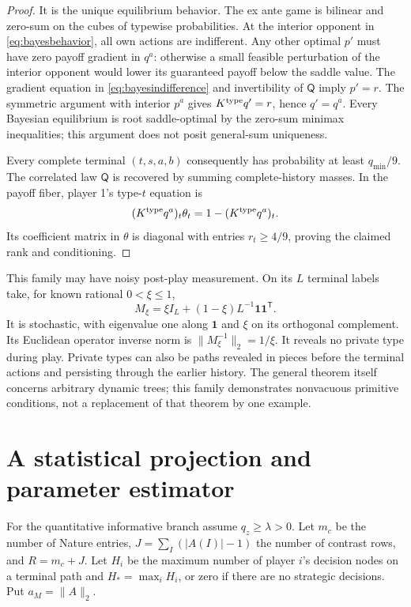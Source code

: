 \documentclass[11pt,a4paper]{article}
\numberwithin{equation}{section}
\theoremstyle{definition}
\begin{document}
\begin{proof}
It is the unique equilibrium behavior. The ex ante game is bilinear
and zero-sum on the cubes of typewise probabilities. At the interior
opponent in \eqref{eq:bayesbehavior}, all own actions are indifferent.
Any other optimal \(p'\) must have zero payoff gradient in \(q^a\):
otherwise a small feasible perturbation of the interior opponent
would lower its guaranteed payoff below the saddle value.
The gradient equation in \eqref{eq:bayesindifference} and invertibility
of \(\mathsf Q\) imply \(p'=r\).
The symmetric argument with interior \(p^a\) gives
\(K^{\rm type}q'=r\), hence \(q'=q^a\).
Every Bayesian equilibrium is root saddle-optimal by the zero-sum
minimax inequalities; this argument does not posit general-sum uniqueness.

Every complete terminal \((t,s,a,b)\) consequently has probability
at least \(q_{\min}/9\). The correlated law \(\mathsf Q\) is recovered
by summing complete-history masses. In the payoff fiber, player 1's
type-\(t\) equation is
\[
 (K^{\rm type}q^a)_t\theta_t
       =1-(K^{\rm type}q^a)_t.
\]
Its coefficient matrix in \(\theta\) is diagonal with entries
\(r_t\ge4/9\), proving the claimed rank and conditioning.
\end{proof}

This family may have noisy post-play measurement. On its \(L\)
terminal labels take, for known rational \(0<\xi\le1\),
\begin{equation}\label{eq:noisychannel}
 M_\xi=\xi I_L+(1-\xi)L^{-1}\mathbf1\mathbf1^{\mathsf T}.
\end{equation}
It is stochastic, with eigenvalue one along \(\mathbf1\) and
\(\xi\) on its orthogonal complement. Its Euclidean operator inverse
norm is \(\|M_\xi^{-1}\|_2=1/\xi\).
It reveals no private type during play. Private types can also be
paths revealed in pieces before the terminal actions and persisting
through the earlier history. The general theorem itself concerns
arbitrary dynamic trees; this family demonstrates nonvacuous primitive
conditions, not a replacement of that theorem by one example.

\section{A statistical projection and parameter estimator}\label{sec:stats}
For the quantitative informative branch assume \(q_z\ge\lambda>0\).
Let \(m_c\) be the number of Nature entries,
\(J=\sum_I(|A(I)|-1)\) the number of contrast rows, and
\(R=m_c+J\). Let \(H_i\) be the maximum number of player \(i\)'s
decision nodes on a terminal path and \(H_*=\max_iH_i\), or zero
if there are no strategic decisions. Put \(a_M=\|A\|_2\).
\end{document}
